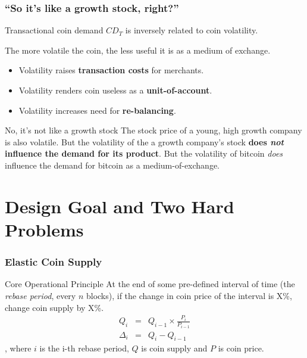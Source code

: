 \documentclass{beamer}
\begin{document}
\begin{frame}
  \frametitle{``So it's like a growth stock, right?''}

  \begin{block}{}
    Transactional coin demand $CD_{T}$ is inversely related to coin
    volatility.
  \end{block}

  The more volatile the coin, the less useful it is as a medium of
  exchange.

  \begin{itemize}
  \item Volatility raises \textbf{transaction costs} for merchants.
  \item Volatility renders coin useless as a \textbf{unit-of-account}.
  \item Volatility increases need for \textbf{re-balancing}.
  \end{itemize}

  \begin{block}{No, it's not like a growth stock}
    The stock price of a young, high growth company is also
    volatile. But the volatility of the a growth company's stock
    \textbf{does \emph{not} influence the demand for its product}. But
    the volatility of bitcoin \emph{does} influence the demand for
    bitcoin as a medium-of-exchange.
  \end{block}
\end{frame}

\section{Design Goal and Two Hard Problems}

\begin{frame}
  \frametitle{Elastic Coin Supply}
  \begin{block}{Core Operational Principle}
    At the end of some pre-defined interval of time (the \emph{rebase
      period}, every $n$ blocks), if the change in coin price of the
    interval is X\%, change coin supply by X\%.
    \begin{eqnarray*}
      Q_{i} &=& Q_{i-1} \times \frac{P_{i}}{P_{i-1}}\\
      \Delta_{i} &=& Q_{i} - Q_{i-1}
    \end{eqnarray*}
    , where $i$ is the i-th rebase period, $Q$ is coin supply and $P$
    is coin price.
  \end{block}
\end{frame}
\end{document}
